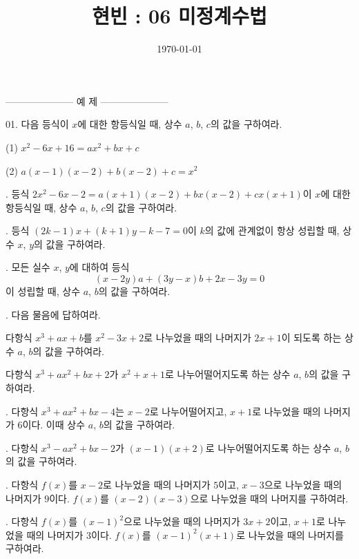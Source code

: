 \documentclass{memoir}
\begin{document}
\title{현빈 : 06 미정계수법}
\author{}
\date{\today}
\maketitle

--------------------- 예 제 ---------------------

01.
다음 등식이 \(x\)에 대한 항등식일 때, 상수 \(a\), \(b\), \(c\)의 값을 구하여라.

\quad\:
(1) \(x^2-6x+16=ax^2+bx+c\)

\quad\:
(2) \(a(x-1)(x-2)+b(x-2)+c=x^2\)

.
등식 \(2x^2-6x-2=a(x+1)(x-2)+bx(x-2)+cx(x+1)\)이 \(x\)에 대한 항등식일 때, 상수 \(a\), \(b\), \(c\)의 값을 구하여라.

.
등식 \((2k-1)x+(k+1)y-k-7=0\)이 \(k\)의 값에 관계없이 항상 성립할 때, 상수 \(x\), \(y\)의 값을 구하여라.

.
모든 실수 \(x\), \(y\)에 대하여 등식
\[(x-2y)a+(3y-x)b+2x-3y=0\]
이 성립할 때, 상수 \(a\), \(b\)의 값을 구하여라.

.
다음 물음에 답하여라.

다항식 \(x^3+ax+b\)를 \(x^2-3x+2\)로 나누었을 때의 나머지가 \(2x+1\)이 되도록 하는 상수 \(a\), \(b\)의 값을 구하여라.

다항식 \(x^3+ax^2+bx+2\)가 \(x^2+x+1\)로 나누어떨어지도록  하는 상수 \(a\), \(b\)의 값을 구하여라.

.
다항식 \(x^3+ax^2+bx-4\)는 \(x-2\)로 나누어떨어지고, \(x+1\)로 나누었을 때의 나머지가 \(6\)이다.
이때 상수 \(a\), \(b\)의 값을 구하여라.

.
다항식 \(x^3-ax^2+bx-2\)가 \((x-1)(x+2)\)로 나누어떨어지도록 하는 상수 \(a\), \(b\)의 값을 구하여라.

.
다항식 \(f(x)\)를 \(x-2\)로 나누었을 때의 나머지가 \(5\)이고, \(x-3\)으로 나누었을 때의 나머지가 \(9\)이다.
\(f(x)\)를 \((x-2)(x-3)\)으로 나누었을 때의 나머지를 구하여라.

.
다항식 \(f(x)\)를 \((x-1)^2\)으로 나누었을 때의 나머지가 \(3x+2\)이고, \(x+1\)로 나누었을 때의 나머지가 \(3\)이다.
\(f(x)\)를 \((x-1)^2(x+1)\)로 나누었을 때의 나머지를 구하여라.


\end{document}
